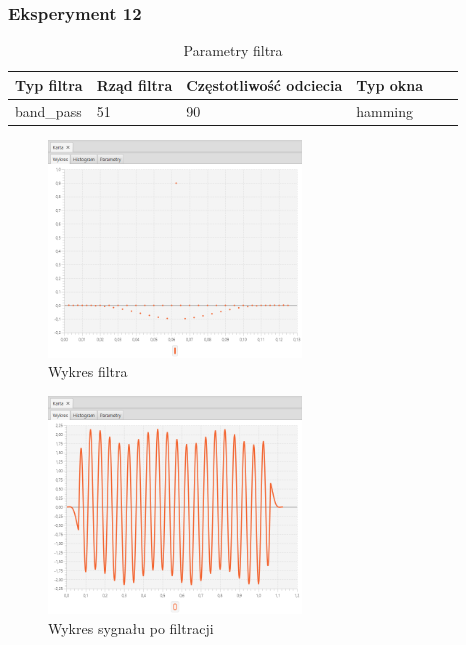 \documentclass[12pt]{article}
\begin{document}
{{            \subsubsection{Eksperyment 12} {
                \begin{table}[H]
                \centering
                \begin{tabular}{|l|l|l|l|l|l|}
                \hline
                Typ filtra & Rząd filtra & Częstotliwość odciecia & Typ okna  \\\hline
                 band\_pass & 51 & 90 & hamming     \\\hline
                \end{tabular}
                \caption{Parametry filtra}
                \end{table}
                \begin{figure}[H]
                \centering
                \includegraphics[width=0.6\textwidth]{img/result/filter/experiment12/data_draw_3e_filter_data_114327.png}
                \caption{Wykres filtra}
                \end{figure}

                \begin{figure}[H]
                \centering
                \includegraphics[width=0.6\textwidth]{img/result/filter/experiment12/data_draw_3e_result_reconstr_data_114439.png}
                \caption{Wykres sygnału po filtracji}
                \end{figure}
            }
            \newpage

}}
\end{document}
